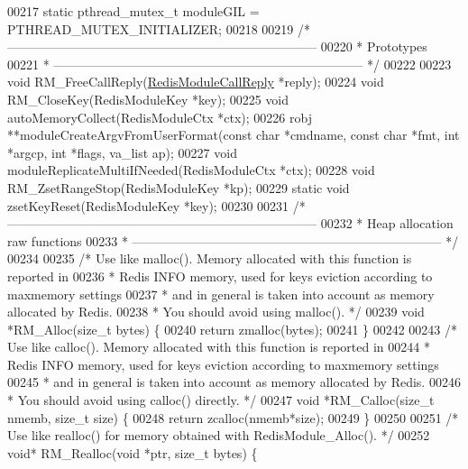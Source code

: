 \begin{DoxyCode}
00217 \textcolor{keyword}{static} pthread\_mutex\_t moduleGIL = PTHREAD\_MUTEX\_INITIALIZER;
00218 
00219 \textcolor{comment}{/* --------------------------------------------------------------------------}
00220 \textcolor{comment}{ * Prototypes}
00221 \textcolor{comment}{ * -------------------------------------------------------------------------- */}
00222 
00223 \textcolor{keywordtype}{void} RM\_FreeCallReply(\hyperlink{structRedisModuleCallReply}{RedisModuleCallReply} *reply);
00224 \textcolor{keywordtype}{void} RM\_CloseKey(RedisModuleKey *key);
00225 \textcolor{keywordtype}{void} autoMemoryCollect(RedisModuleCtx *ctx);
00226 robj **moduleCreateArgvFromUserFormat(\textcolor{keyword}{const} \textcolor{keywordtype}{char} *cmdname, \textcolor{keyword}{const} \textcolor{keywordtype}{char} *fmt, \textcolor{keywordtype}{int} *argcp, \textcolor{keywordtype}{int} *flags, 
      va\_list ap);
00227 \textcolor{keywordtype}{void} moduleReplicateMultiIfNeeded(RedisModuleCtx *ctx);
00228 \textcolor{keywordtype}{void} RM\_ZsetRangeStop(RedisModuleKey *kp);
00229 \textcolor{keyword}{static} \textcolor{keywordtype}{void} zsetKeyReset(RedisModuleKey *key);
00230 
00231 \textcolor{comment}{/* --------------------------------------------------------------------------}
00232 \textcolor{comment}{ * Heap allocation raw functions}
00233 \textcolor{comment}{ * -------------------------------------------------------------------------- */}
00234 
00235 \textcolor{comment}{/* Use like malloc(). Memory allocated with this function is reported in}
00236 \textcolor{comment}{ * Redis INFO memory, used for keys eviction according to maxmemory settings}
00237 \textcolor{comment}{ * and in general is taken into account as memory allocated by Redis.}
00238 \textcolor{comment}{ * You should avoid using malloc(). */}
00239 \textcolor{keywordtype}{void} *RM\_Alloc(size\_t bytes) \{
00240     \textcolor{keywordflow}{return} zmalloc(bytes);
00241 \}
00242 
00243 \textcolor{comment}{/* Use like calloc(). Memory allocated with this function is reported in}
00244 \textcolor{comment}{ * Redis INFO memory, used for keys eviction according to maxmemory settings}
00245 \textcolor{comment}{ * and in general is taken into account as memory allocated by Redis.}
00246 \textcolor{comment}{ * You should avoid using calloc() directly. */}
00247 \textcolor{keywordtype}{void} *RM\_Calloc(size\_t nmemb, size\_t size) \{
00248     \textcolor{keywordflow}{return} zcalloc(nmemb*size);
00249 \}
00250 
00251 \textcolor{comment}{/* Use like realloc() for memory obtained with RedisModule\_Alloc(). */}
00252 \textcolor{keywordtype}{void}* RM\_Realloc(\textcolor{keywordtype}{void} *ptr, size\_t bytes) \{

\end{DoxyCode}
